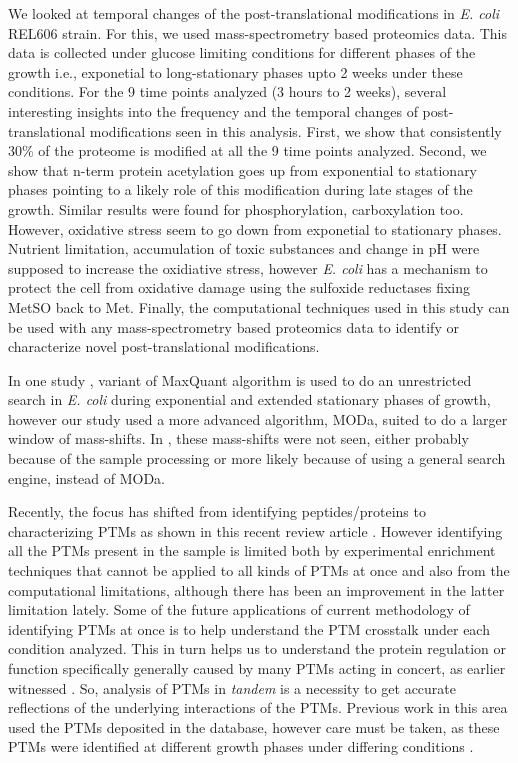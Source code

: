 \documentclass[12pt]{article}
\begin{document}
We looked at temporal changes of the post-translational modifications in \emph{E. coli} REL606 strain. For this, we used mass-spectrometry based proteomics data. This data is collected under glucose limiting conditions for different phases of the growth i.e., exponetial to long-stationary phases upto 2 weeks under these conditions. For the 9 time points analyzed (3 hours to 2 weeks), several interesting insights into the frequency and the temporal changes of post-translational modifications seen in this analysis. First, we show that consistently 30\% of the proteome is modified at all the 9 time points analyzed. Second, we show that n-term protein acetylation goes up from exponential to stationary phases pointing to a likely role of this modification during late stages of the growth. Similar results were found for phosphorylation, carboxylation too. However, oxidative stress seem to go down from exponetial to stationary phases. Nutrient limitation, accumulation of toxic substances and change in pH were supposed to increase the oxidiative stress, however \emph{E. coli} has a mechanism to protect the cell from oxidative damage using the sulfoxide reductases fixing MetSO back to Met. Finally, the computational techniques used in this study can be used with any mass-spectrometry based proteomics data to identify or characterize novel post-translational modifications.

In one study \cite{Soufietal2015}, variant of MaxQuant algorithm is used to do an unrestricted search in \emph{E. coli} during exponential and extended stationary phases of growth, however our study used a more advanced algorithm, MODa, suited to do a larger window of mass-shifts. In \cite{Soufietal2015}, these mass-shifts were not seen, either probably because of the sample processing or more likely because of using a general search engine, instead of MODa. 

Recently, the focus has shifted from identifying peptides/proteins to characterizing PTMs as shown in this recent review article \cite{OlsenMann2013}. However identifying all the PTMs present in the sample is limited both by experimental enrichment techniques that cannot be applied to all kinds of PTMs at once and also from the computational limitations, although there has been an improvement in the latter limitation lately. Some of the future applications of current methodology of identifying PTMs at once is to help understand the PTM crosstalk under each condition analyzed. This in turn helps us to understand the protein regulation or function specifically generally caused by many PTMs acting in concert, as earlier witnessed \cite{Pengetal2014}. So, analysis of PTMs in \emph{tandem} is a necessity to get accurate reflections of the underlying interactions of the PTMs. Previous work in this area used the PTMs deposited in the database, however care must be taken, as these PTMs were identified at different growth phases under differing conditions \cite{Pengetal2014}.
\end{document}
